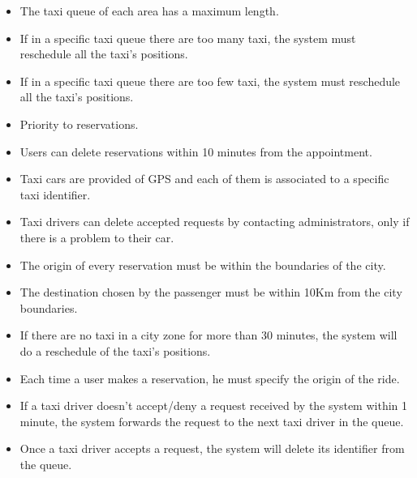 \begin{itemize}
	\item The taxi queue of each area has a maximum length.
	\item If in a specific taxi queue there are too many taxi,  
	the system must reschedule all the taxi's positions.
	\item If in a specific taxi queue there are too few taxi,  
	the system must reschedule all the taxi's positions.
	\item Priority to reservations.
	\item Users can delete reservations within 10 minutes from the appointment. 
	\item Taxi cars are provided of GPS and each of them is associated to a specific taxi identifier.
	\item Taxi drivers can delete accepted requests by contacting administrators, only if there is a problem to their car.
	\item The origin of every reservation must be within the boundaries of the city.
	\item The destination chosen by the passenger must be within 10Km from the city boundaries.
	\item If there are no taxi in a city zone for more than 30 minutes, the system will do a reschedule of the taxi's positions.
	\item Each time a user makes a reservation, he must specify the origin  of the ride.
	\item If a taxi driver doesn't accept/deny a request received by the system within 1 minute, the system forwards the request to the next taxi driver in the queue.
	\item Once a taxi driver accepts a request, the system will delete its identifier from the queue.
\end{itemize}